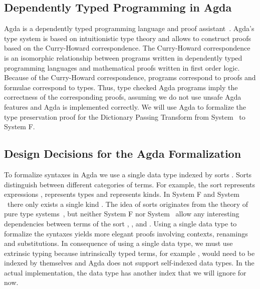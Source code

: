 \subsection{Dependently Typed Programming in Agda}
Agda is a dependently typed programming language and proof assistant~\cite{agda}.
Agda's type system is based on intuitionistic type theory and allows to construct proofs based on the Curry-Howard correspondence. 
The Curry-Howard correspondence is an isomorphic relationship between programs written in dependently typed programming languages and mathematical proofs written in first order logic. 
Because of the Curry-Howard correspondence, programs correspond to proofs and formulae correspond to types. 
Thus, type checked Agda programs imply the correctness of the corresponding proofs, assuming we do not use unsafe Agda features and Agda is implemented correctly. 
We will use Agda to formalize the type preservation proof for the Dictionary Passing Transform from System \Fo\ to System F.

\subsection{Design Decisions for the Agda Formalization}
To formalize syntaxes in Agda we use a single data type  indexed by sorts . 
Sorts distinguish between different categories of terms.
For example, the sort  represents expressions ,  represents types  and  represents kinds. In System F and System \Fo\ there only exists a single kind . 
The idea of sorts originates from the theory of pure type systems~\cite{pts}, but neither System F nor System \Fo\ allow any interesting dependencies between terms of the sort , , and .
Using a single data type to formalize the syntaxes yields more elegant proofs involving contexts, renamings and substitutions. 
In consequence of using a single data type, we must use extrinsic typing because intrinsically typed terms, for example     , would need to be indexed by themselves and Agda does not support self-indexed data types. 
In the actual implementation, the data type  has another index  that we will ignore for now.

